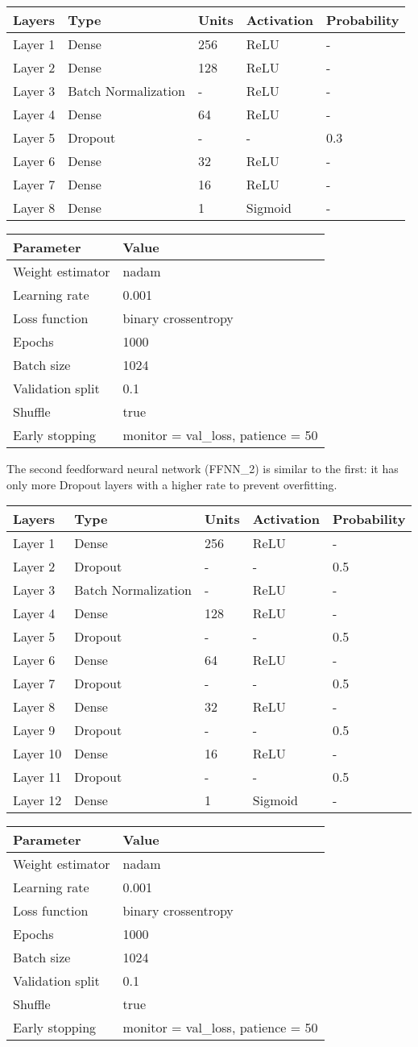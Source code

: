 \begin{longtable}[]{@{}lllll@{}}
\toprule
\textbf{Layers} & \textbf{Type} & \textbf{Units} & \textbf{Activation} & \textbf{Probability}\tabularnewline
\midrule
\endhead
Layer 1 & Dense & 256 & ReLU & -\tabularnewline
Layer 2 & Dense & 128 & ReLU & -\tabularnewline
Layer 3 & Batch Normalization & - & ReLU & -\tabularnewline
Layer 4 & Dense & 64 & ReLU & -\tabularnewline
Layer 5 & Dropout & - & - & 0.3\tabularnewline
Layer 6 & Dense & 32 & ReLU & -\tabularnewline
Layer 7 & Dense & 16 & ReLU & -\tabularnewline
Layer 8 & Dense & 1 & Sigmoid & -\tabularnewline
\bottomrule
\end{longtable}

\begin{longtable}[]{@{}ll@{}}
\toprule
\textbf{Parameter} & \textbf{Value}\tabularnewline
\midrule
\endhead
Weight estimator & nadam\tabularnewline
Learning rate & 0.001\tabularnewline
Loss function & binary crossentropy\tabularnewline
Epochs & 1000\tabularnewline
Batch size & 1024\tabularnewline
Validation split & 0.1\tabularnewline
Shuffle & true\tabularnewline
Early stopping & monitor = val\_loss, patience = 50\tabularnewline
\bottomrule
\end{longtable}

The second feedforward neural network (FFNN\_2) is similar to the first:
it has only more Dropout layers with a higher rate to prevent
overfitting.

\begin{longtable}[]{@{}lllll@{}}
\toprule
\textbf{Layers} & \textbf{Type} & \textbf{Units} & \textbf{Activation} & \textbf{Probability}\tabularnewline
\midrule
\endhead
Layer 1 & Dense & 256 & ReLU & -\tabularnewline
Layer 2 & Dropout & - & - & 0.5\tabularnewline
Layer 3 & Batch Normalization & - & ReLU & -\tabularnewline
Layer 4 & Dense & 128 & ReLU & -\tabularnewline
Layer 5 & Dropout & - & - & 0.5\tabularnewline
Layer 6 & Dense & 64 & ReLU & -\tabularnewline
Layer 7 & Dropout & - & - & 0.5\tabularnewline
Layer 8 & Dense & 32 & ReLU & -\tabularnewline
Layer 9 & Dropout & - & - & 0.5\tabularnewline
Layer 10 & Dense & 16 & ReLU & -\tabularnewline
Layer 11 & Dropout & - & - & 0.5\tabularnewline
Layer 12 & Dense & 1 & Sigmoid & -\tabularnewline
\bottomrule
\end{longtable}

\begin{longtable}[]{@{}ll@{}}
\toprule
\textbf{Parameter} & \textbf{Value}\tabularnewline
\midrule
\endhead
Weight estimator & nadam\tabularnewline
Learning rate & 0.001\tabularnewline
Loss function & binary crossentropy\tabularnewline
Epochs & 1000\tabularnewline
Batch size & 1024\tabularnewline
Validation split & 0.1\tabularnewline
Shuffle & true\tabularnewline
Early stopping & monitor = val\_loss, patience = 50\tabularnewline
\bottomrule
\end{longtable}

